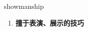 
\begin{frame}
{\huge showmanship}
\begin{center}
\begin{enumerate}\Large
  \item \textbf{擅于表演、展示的技巧}
\end{enumerate}
\end{center}
\end{frame}
